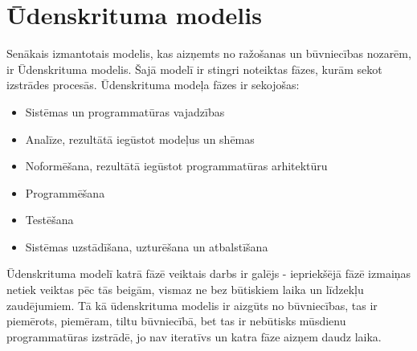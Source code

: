 \section{Ūdenskrituma modelis}
Senākais izmantotais modelis, kas aizņemts no ražošanas un būvniecības nozarēm, ir Ūdenskrituma modelis. Šajā modelī ir stingri noteiktas fāzes, kurām sekot izstrādes procesās.
Ūdenskrituma modeļa fāzes ir sekojošas:
\begin{itemize}
	\item Sistēmas un programmatūras vajadzības
	\item Analīze, rezultātā iegūstot modeļus un shēmas
	\item Noformēšana, rezultātā iegūstot programmatūras arhitektūru
	\item Programmēšana
	\item Testēšana
	\item Sistēmas uzstādīšana, uzturēšana un atbalstīšana
\end{itemize}
Ūdenskrituma modelī katrā fāzē veiktais darbs ir galējs - iepriekšējā fāzē izmaiņas netiek veiktas pēc tās beigām, vismaz ne bez būtiskiem laika un līdzekļu zaudējumiem.
Tā kā ūdenskrituma modelis ir aizgūts no būvniecības, tas ir piemērots, piemēram, tiltu būvniecībā, bet tas ir nebūtisks mūsdienu programmatūras izstrādē, jo nav iteratīvs un katra fāze aizņem daudz laika.


